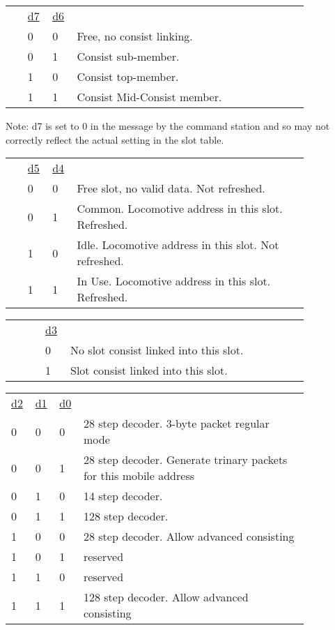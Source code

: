 \begin{tabular}{p{0.05\linewidth} p{0.05\linewidth} p{0.05\linewidth} p{0.70\linewidth}} 
& \underline{d7} & \underline{d6} & \\
& 0 & 0 & Free, no consist linking.\\
& 0 & 1 & Consist sub-member.\\
& 1 & 0 & Consist top-member.\\
& 1 & 1 & Consist Mid-Consist member. \\
\end{tabular}

Note: d7 is set to 0 in the message by the command station and so may not correctly reflect the actual setting in the slot table.\\

\begin{tabular}{p{0.05\linewidth} p{0.05\linewidth} p{0.05\linewidth} p{0.70\linewidth}} 
& \underline{d5} & \underline{d4} & \\
& 0 & 0 & Free slot, no valid data. Not refreshed.\\
& 0 & 1 & Common. Locomotive address in this slot. Refreshed.\\
& 1 & 0 & Idle. Locomotive address in this slot. Not refreshed.\\
& 1 & 1 & In Use. Locomotive address in this slot. Refreshed. \\
\end{tabular}

 \begin{tabular}{p{0.05\linewidth} p{0.05\linewidth} p{0.05\linewidth} p{0.70\linewidth}} 
& & \underline{d3} & \\
& & 0 & No slot consist linked into this slot.\\
& & 1 & Slot consist linked into this slot.\\
\end{tabular}

\begin{tabular}{p{0.05\linewidth} p{0.05\linewidth} p{0.05\linewidth} p{0.70\linewidth}} 
\underline{d2} & \underline{d1} & \underline{d0} & \\
0 & 0 & 0 & 28 step decoder. 3-byte packet regular mode\\
0 & 0 & 1 & 28 step decoder. Generate trinary packets for this mobile address\\
0 & 1 & 0 & 14 step decoder. \\
0 & 1 & 1 & 128 step decoder. \\
1 & 0 & 0 & 28 step decoder. Allow advanced consisting\\
1 & 0 & 1 & reserved\\
1 & 1 & 0 & reserved\\
1 & 1 & 1 & 128 step decoder. Allow advanced consisting\\
\end{tabular}

